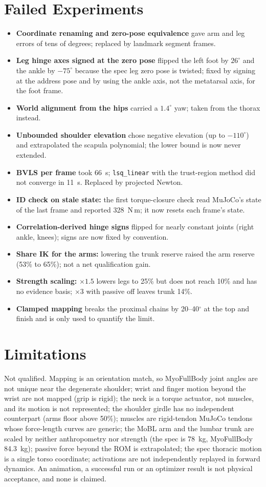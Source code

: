 \documentclass[11pt,a4paper]{article}
\begin{document}
\section{Failed Experiments}
\begin{itemize}
\item \textbf{Coordinate renaming and zero-pose equivalence} gave arm and leg errors of tens of degrees; replaced by landmark segment frames.
\item \textbf{Leg hinge axes signed at the zero pose} flipped the left foot by $26^\circ$ and the ankle by $-75^\circ$ because the spec leg zero pose is twisted; fixed by signing at the address pose and by using the ankle axis, not the metatarsal axis, for the foot frame.
\item \textbf{World alignment from the hips} carried a $1.4^\circ$ yaw; taken from the thorax instead.
\item \textbf{Unbounded shoulder elevation} chose negative elevation (up to $-110^\circ$) and extrapolated the scapula polynomial; the lower bound is now never extended.
\item \textbf{BVLS per frame} took 66~s; \texttt{lsq\_linear} with the trust-region method did not converge in 11~s. Replaced by projected Newton.
\item \textbf{ID check on stale state:} the first torque-closure check read MuJoCo's state of the last frame and reported 328~N\,m; it now resets each frame's state.
\item \textbf{Correlation-derived hinge signs} flipped for nearly constant joints (right ankle, knees); signs are now fixed by convention.
\item \textbf{Share IK for the arms:} lowering the trunk reserve raised the arm reserve (53\% to 65\%); not a net qualification gain.
\item \textbf{Strength scaling:} $\times1.5$ lowers legs to 25\% but does not reach 10\% and has no evidence basis; $\times3$ with passive off leaves trunk 14\%.
\item \textbf{Clamped mapping} breaks the proximal chains by 20--40$^\circ$ at the top and finish and is only used to quantify the limit.
\end{itemize}

\section{Limitations}
Not qualified. Mapping is an orientation match, so MyoFullBody joint angles are not unique near the degenerate shoulder; wrist and finger motion beyond the wrist are not mapped (grip is rigid); the neck is a torque actuator, not muscles, and its motion is not represented; the shoulder girdle has no independent counterpart (arms floor above 50\%); muscles are rigid-tendon MuJoCo tendons whose force-length curves are generic; the MoBL arm and the lumbar trunk are scaled by neither anthropometry nor strength (the spec is 78~kg, MyoFullBody 84.3~kg); passive force beyond the ROM is extrapolated; the spec thoracic motion is a single torso coordinate; activations are not independently replayed in forward dynamics. An animation, a successful run or an optimizer result is not physical acceptance, and none is claimed.
\end{document}
